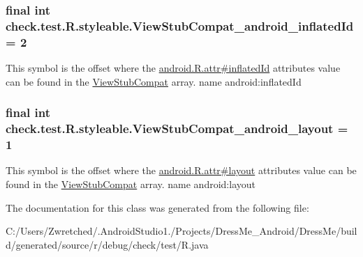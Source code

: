 \subsubsection[{View\+Stub\+Compat\+\_\+android\+\_\+inflated\+Id}]{\setlength{\rightskip}{0pt plus 5cm}final int check.\+test.\+R.\+styleable.\+View\+Stub\+Compat\+\_\+android\+\_\+inflated\+Id = 2\hspace{0.3cm}{\ttfamily [static]}}\label{classcheck_1_1test_1_1_r_1_1styleable_a7c6502320542baa7a355bd6d9665ff5f}
This symbol is the offset where the \hyperlink{}{android.\+R.\+attr\#inflated\+Id} attribute\textquotesingle{}s value can be found in the \hyperlink{classcheck_1_1test_1_1_r_1_1styleable_adf691a9cd72c9028688f92bcb9b1c303}{View\+Stub\+Compat} array.  name android\+:inflated\+Id \hypertarget{classcheck_1_1test_1_1_r_1_1styleable_ad1bcaf475dc40c26f77157642598f49c}{}
\subsubsection[{View\+Stub\+Compat\+\_\+android\+\_\+layout}]{\setlength{\rightskip}{0pt plus 5cm}final int check.\+test.\+R.\+styleable.\+View\+Stub\+Compat\+\_\+android\+\_\+layout = 1\hspace{0.3cm}{\ttfamily [static]}}\label{classcheck_1_1test_1_1_r_1_1styleable_ad1bcaf475dc40c26f77157642598f49c}
This symbol is the offset where the \hyperlink{}{android.\+R.\+attr\#layout} attribute\textquotesingle{}s value can be found in the \hyperlink{classcheck_1_1test_1_1_r_1_1styleable_adf691a9cd72c9028688f92bcb9b1c303}{View\+Stub\+Compat} array.  name android\+:layout 

The documentation for this class was generated from the following file\+:\begin{DoxyCompactItemize}
\item 
C\+:/\+Users/\+Zwretched/.\+Android\+Studio1./\+Projects/\+Dress\+Me\+\_\+\+Android/\+Dress\+Me/build/generated/source/r/debug/check/test/R.\+java\end{DoxyCompactItemize}
